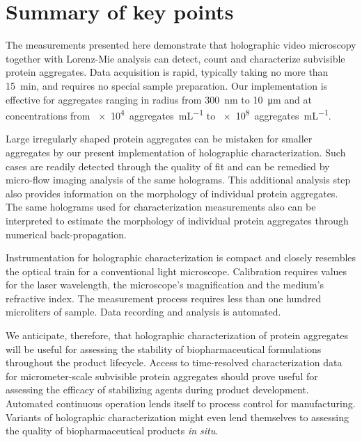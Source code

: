 \section{Summary of key points}
\label{sec:summary}

The measurements presented here demonstrate that holographic video
microscopy together with Lorenz-Mie analysis can detect,
count and characterize subvisible protein aggregates.
Data acquisition is rapid, typically taking no more than
\SI{15}{\minute}, and requires no special sample preparation.
Our implementation is effective for aggregates ranging in radius
from \SI{300}{\nm} to \SI{10}{\um} and at concentrations from
\SI{e4}{aggregates\per\mL} to \SI{e8}{aggregates\per\mL}.

Large irregularly shaped protein aggregates can be mistaken for smaller aggregates by our present implementation of holographic characterization. Such cases are readily detected through the quality of fit and can be remedied by micro-flow imaging analysis of the same holograms. This additional analysis step also provides information on the morphology of individual protein aggregates.
The same holograms used for characterization measurements
also can be interpreted to estimate the morphology of individual
protein aggregates through numerical back-propagation.

Instrumentation for holographic characterization is compact and closely resembles the optical train for a conventional light microscope. Calibration requires values for the laser wavelength, the microscope’s magnification and the medium’s refractive index. The measurement process requires less than one hundred microliters of sample. Data recording and analysis is automated.

We anticipate, therefore, that holographic characterization of protein aggregates will be useful for assessing the stability of biopharmaceutical formulations throughout the product lifecycle. Access to time-resolved characterization data for micrometer-scale subvisible protein aggregates should prove useful for assessing the efficacy of stabilizing agents during product development. Automated continuous operation lends itself to process control for manufacturing. Variants of holographic characterization might even lend themselves to assessing the quality of biopharmaceutical products \emph{in situ}.

